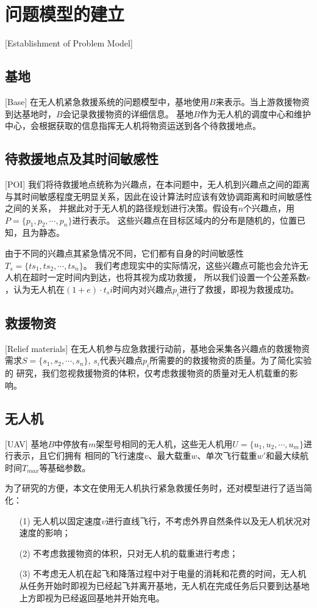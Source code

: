 \section{问题模型的建立}[Establishment of Problem Model]

\subsection{基地}[Base]
在无人机紧急救援系统的问题模型中，基地使用$B$来表示。当上游救援物资到达基地时，$B$会记录救援物资的详细信息。
基地$B$作为无人机的调度中心和维护中心，会根据获取的信息指挥无人机将物资运送到各个待救援地点。
\subsection{待救援地点及其时间敏感性}[POI]
我们将待救援地点统称为兴趣点，在本问题中，无人机到兴趣点之间的距离与其时间敏感程度无明显关系，因此在设计算法时应该有效协调距离和时间敏感性之间的关系，
并据此对于无人机的路径规划进行决策。假设有$n$个兴趣点，用$P=\lbrace p_1, p_2, \cdots ,p_n \rbrace$进行表示。
这些兴趣点在目标区域内的分布是随机的，位置已知，且为静态。


由于不同的兴趣点其紧急情况不同，它们都有自身的时间敏感性$T_s=\lbrace ts_1, ts_2, \cdots ,ts_n \rbrace$。
我们考虑现实中的实际情况，这些兴趣点可能也会允许无人机在超时一定时间内到达，也将其视为成功救援，
所以我们设置一个公差系数$e$，认为无人机在$(1+e) \cdot t_si$时间内对兴趣点$p_i$进行了救援，即视为救援成功。
\subsection{救援物资}[Relief materials]
在无人机参与应急救援行动前，基地会采集各兴趣点的救援物资需求$S=\lbrace s_1, s_2, \cdots ,s_n \rbrace$, $s_i$代表兴趣点$p_i$所需要的的救援物资的质量。为了简化实验的
研究，我们忽视救援物资的体积，仅考虑救援物资的质量对无人机载重的影响。
\subsection{无人机}[UAV]
基地$B$中停放有$m$架型号相同的无人机，这些无人机用$U=\lbrace u_1, u_2, \cdots ,u_m \rbrace$进行表示，且它们拥有
相同的飞行速度$v$、最大载重$w$、单次飞行载重$w \prime$和最大续航时间$T_{max}$等基础参数。


为了研究的方便，本文在使用无人机执行紧急救援任务时，还对模型进行了适当简化：
\begin{itemize}
	\item [(1)] 无人机以固定速度$v$进行直线飞行，不考虑外界自然条件以及无人机状况对速度的影响；
 	\item [(2)] 不考虑救援物资的体积，只对无人机的载重进行考虑；
  	\item [(3)] 不考虑无人机在起飞和降落过程中对于电量的消耗和花费的时间，无人机从任务开始时即视为已经起飞并离开基地，无人机在完成任务后只要到达基地上方即视为已经返回基地并开始充电。
\end{itemize}

